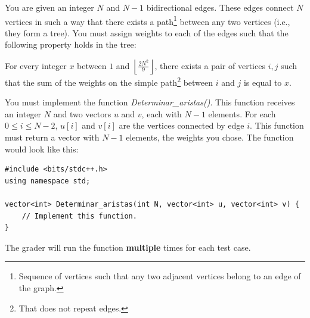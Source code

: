\documentclass[12pt]{scrartcl}
\begin{document}
    
    \vspace{10pt}

    
        You are given an integer $N$ and $N - 1$ bidirectional edges. These edges connect $N$ vertices in such a way that there exists a path\footnote{Sequence of vertices such that any two adjacent vertices belong to an edge of the graph.} between any two vertices (i.e., they form a tree). You must assign weights to each of the edges such that the following property holds in the tree:
        
        For every integer $x$ between $1$ and $\left\lfloor \frac{2N^2}{9} \right\rfloor$, there exists a pair of vertices $i, j$ such that the sum of the weights on the simple path\footnote{That does not repeat edges.} between $i$ and $j$ is equal to $x$.
    

        You must implement the function \textit{Determinar\_aristas()}. This function receives an integer $N$ and two vectors $u$ and $v$, each with $N - 1$ elements. For each $0 \le i \le N - 2$, $u[i]$ and $v[i]$ are the vertices connected by edge $i$. This function must return a vector with $N - 1$ elements, the weights you chose.
        The function would look like this:

\begin{verbatim}
#include <bits/stdc++.h>
using namespace std;

vector<int> Determinar_aristas(int N, vector<int> u, vector<int> v) {
    // Implement this function.
}
\end{verbatim}

    The grader will run the function \textbf{multiple} times for each test case.

    
\end{document}

